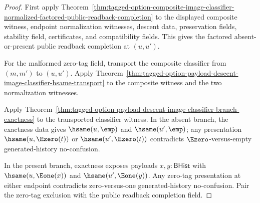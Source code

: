 \begin{proof}
First apply
Theorem~\ref{thm:tagged-option-composite-image-classifier-normalized-factored-public-readback-completion}
to the displayed composite witness, endpoint normalization witnesses, descent
data, preservation fields, stability field, certificates, and compatibility
fields. This gives the factored absent-or-present public readback completion at
$(u,u')$.

For the malformed zero-tag field, transport the composite classifier from
$(m,m')$ to $(u,u')$. Apply
Theorem~\ref{thm:tagged-option-payload-descent-image-classifier-hsame-transport}
to the composite witness and the two normalization witnesses.

Apply
Theorem~\ref{thm:tagged-option-payload-descent-image-classifier-branch-exactness}
to the transported classifier witness. In the absent branch, the exactness data
gives $\hsame(u,\emp)$ and $\hsame(u',\emp)$; any presentation
$\hsame(u,\Ezero(t))$ or $\hsame(u',\Ezero(t))$ contradicts
$\Ezero$-versus-empty generated-history no-confusion.

In the present branch, exactness exposes payloads $x,y:\mathsf{BHist}$ with
$\hsame(u,\Eone(x))$ and $\hsame(u',\Eone(y))$. Any zero-tag presentation at
either endpoint contradicts zero-versus-one generated-history no-confusion.
Pair the zero-tag exclusion with the public readback completion field.
\end{proof}

